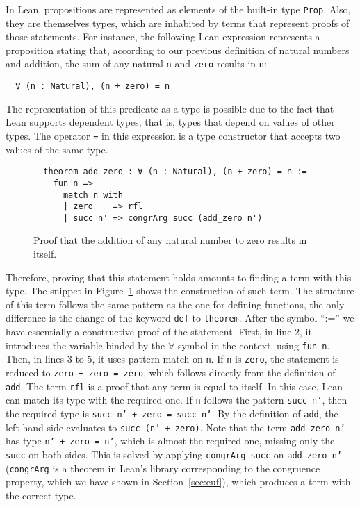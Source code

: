 In Lean, propositions are represented as elements of the built-in type \texttt{Prop}. Also, they are themselves types, which are inhabited by terms that represent proofs of those statements. For instance, the following Lean expression represents a proposition stating that, according to our previous definition of natural numbers and addition, the sum of any natural \texttt{n} and \texttt{zero} results in \texttt{n}:

\begin{verbatim}
  ∀ (n : Natural), (n + zero) = n
\end{verbatim}

The representation of this predicate as a type is possible due to the fact that Lean supports dependent types, that is, types that depend on values of other types. The operator \texttt{=} in this expression is a type constructor that accepts two values of the same type.


\begin{figure}[t]
\begin{verbatim}
  theorem add_zero : ∀ (n : Natural), (n + zero) = n :=
    fun n =>
      match n with
      | zero    => rfl
      | succ n' => congrArg succ (add_zero n')
\end{verbatim}
\caption{Proof that the addition of any natural number to zero results in itself.}\label{addZero}
\end{figure}

Therefore, proving that this statement holds amounts to finding a term with this type. The snippet in Figure~\ref{addZero} shows the construction of such term.
The structure of this term follows the same pattern as the one for defining functions, the only difference is the change of the keyword \texttt{def} to \texttt{theorem}. After the symbol ``:='' we have essentially a constructive proof of the statement. First, in line 2, it introduces the variable binded by the $\forall$ symbol in the context, using \texttt{fun n}. Then, in lines 3 to 5, it uses pattern match on \texttt{n}. If \texttt{n} is \texttt{zero}, the statement is reduced to \texttt{zero + zero = zero}, which follows directly from the definition of \texttt{add}. The term \texttt{rfl} is a proof that any term is equal to itself. In this case, Lean can match its type with the required one. If \texttt{n} follows the pattern \texttt{succ n'}, then the required type is \texttt{succ n' + zero = succ n'}. By the definition of \texttt{add}, the left-hand side evaluates to \texttt{succ (n' + zero)}.
Note that the term \texttt{add\_zero n'} has type \texttt{n' + zero = n'}, which is almost the required one, missing only the \texttt{succ} on both sides. This is solved by applying \texttt{congrArg succ} on \texttt{add\_zero n'} (\texttt{congrArg} is a theorem in Lean's library corresponding to the congruence property, which we have shown in Section~\ref{sec:euf}), which produces a term with the correct type.


